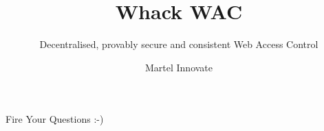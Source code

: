 \documentclass[10pt]{beamer}
\title{Whack WAC}
\subtitle{Decentralised, provably secure and consistent Web Access Control}
\author{Martel Innovate}
\date{}
\begin{document}
  \maketitle

  
  
  \begin{frame}[standout]
    Fire Your Questions :-)
  \end{frame}
\end{document}
